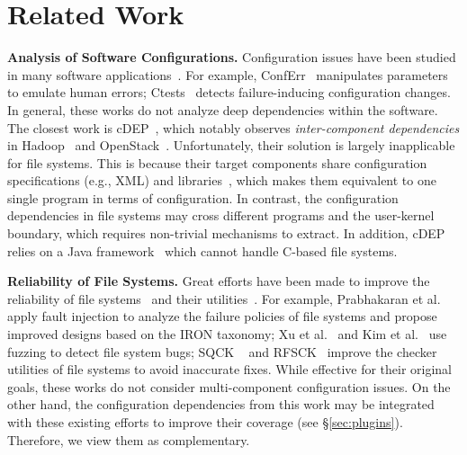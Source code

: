 \section{Related Work}
\label{sec:related}
\vspace{-0.05in}

\smallskip
\noindent
{\bf Analysis of Software Configurations.} 
Configuration issues have been  studied in many software applications~\cite{cdep,ctest-OSDI20,confu,Conferr-DSN08,spex,ConfigEverywhere-DongpuJin-ICSE14,NavigatingMazeBioinfo-MikaelaCashman-ASE18,ArielRabkin-ICSE11}. 
For example, ConfErr~\cite{Conferr-DSN08} manipulates parameters to emulate human errors;  
Ctests~\cite{ctest-OSDI20} detects failure-inducing configuration changes.
In general, these works do not analyze deep   dependencies within the  software.
The closest work is {cDEP}~\cite{cdep},
which notably observes \textit{inter-component dependencies} in  Hadoop~\cite{Hadoop} and OpenStack~\cite{OpenStack}. Unfortunately, their solution is largely inapplicable for file systems. 
This is because their target components share   configuration specifications (e.g., XML)  and libraries~\cite{ApacheCommonsConfiguraitons2}, which makes them equivalent to one single  program in terms of configuration. 
In contrast, 
the configuration dependencies in file systems may cross different programs and the user-kernel boundary, which requires  non-trivial mechanisms to extract.
In addition, cDEP relies on a Java   framework~\cite{soot} 
which cannot handle C-based file systems. 

\smallskip
\noindent
{\bf Reliability of File Systems.} 
Great efforts have been made to improve the reliability of 
file systems~\cite{bornholt2016specifying,recon12,hydra-2019,Changwoo-SOSP15-CrosscheckingFS,iron05} 
and  their  utilities~\cite{OmFAST18,Om-TOS18,SQCK,spiffy,SWIFT}.
For example, 
Prabhakaran et al.~\cite{iron05} apply fault injection to analyze the failure policies of  file
systems and propose improved designs based on the IRON taxonomy; 
Xu et al.~\cite{xu2019fuzzing} and Kim et al.~\cite{hydra-2019} use fuzzing to detect file system bugs;  
SQCK ~\cite{SQCK} and RFSCK~\cite{OmFAST18} improve the checker utilities of file systems to avoid inaccurate fixes. 
 While effective for their original  goals, these works do not consider multi-component configuration issues. 
 On the other hand, the configuration dependencies from this work may be integrated with these existing efforts to improve their coverage (see \S\ref{sec:plugins}).  
 Therefore, we view them as complementary. 
 
